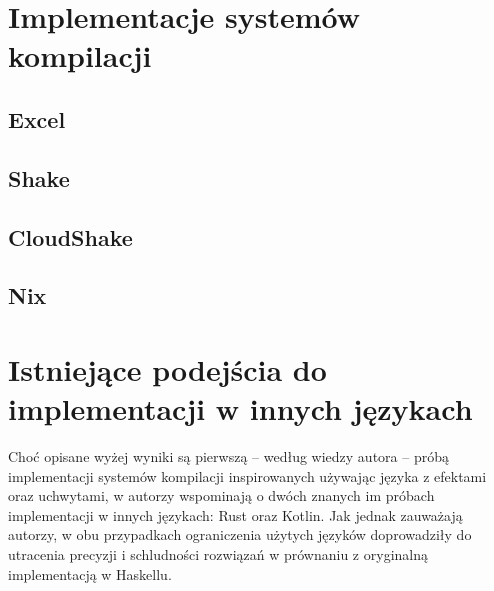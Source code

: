 \section{Implementacje systemów kompilacji}

\subsection{Excel}







\subsection{Shake}







\subsection{CloudShake}






\subsection{Nix}






\section{Istniejące podejścia do implementacji w innych językach}

Choć opisane wyżej wyniki są pierwszą -- według wiedzy autora -- próbą implementacji systemów kompilacji inspirowanych \BSaLC używając języka z efektami oraz uchwytami, w \BSaLCTP autorzy wspominają o dwóch znanych im próbach implementacji w innych językach: Rust\cite{translation_rust} oraz Kotlin\cite{translation_kotlin}. Jak jednak zauważają autorzy, w obu przypadkach ograniczenia użytych języków doprowadziły do utracenia precyzji i schludności rozwiązań w prównaniu z oryginalną implementacją w Haskellu.
